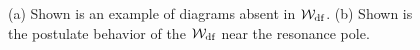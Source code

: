 \begin{figure}[t]
\begin{center}
\hspace{.5cm}
\caption{(a) Shown is an example of diagrams absent in ${\mathcal{W}}_{\rm df}$. (b) Shown is the postulate behavior of the ${\mathcal{W}}_{\rm df}$ near the resonance pole. }\label{fig:Wdf_pole}
\end{center}
\end{figure}
%




\clearpage

